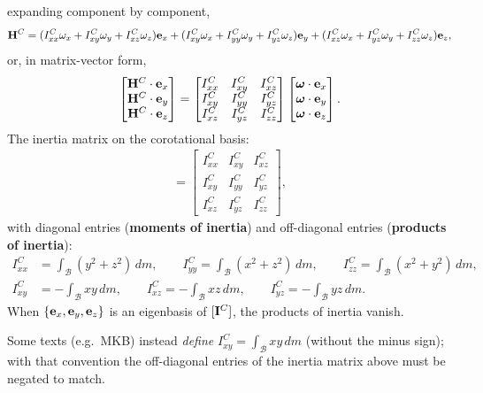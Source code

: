 \documentclass[
  letterpaper,
  DIV=11,
  numbers=noendperiod]{scrreprt}
\newcommand{\bomega}{\boldsymbol{\omega}}
\begin{document}
expanding component by component, \begin{align}
    {\bf H}^C = (I^C_{xx}\omega_x+I^C_{xy}\omega_y+I^C_{xz}\omega_z){\bf e}_x+(I^C_{xy}\omega_x+I^C_{yy}\omega_y+I^C_{yz}\omega_z){\bf e}_y+(I^C_{xz}\omega_x+I^C_{yz}\omega_y+I^C_{zz}\omega_z){\bf e}_z,
\end{align} or, in matrix-vector form, \begin{align}
    \begin{bmatrix}{\bf H}^C\cdot{\bf e}_x\\{\bf H}^C\cdot{\bf e}_y\\{\bf H}^C\cdot{\bf e}_z\end{bmatrix}
    =
    \begin{bmatrix}I^C_{xx}&I^C_{xy}&I^C_{xz}\\I^C_{xy}&I^C_{yy}&I^C_{yz}\\I^C_{xz}&I^C_{yz}&I^C_{zz}\end{bmatrix}
    \begin{bmatrix}\bomega\cdot{\bf e}_x\\\bomega\cdot{\bf e}_y\\\bomega\cdot{\bf e}_z\end{bmatrix}.
\end{align} The inertia matrix on the corotational basis: \begin{align}
    [{\bf I}^C] =
    \begin{bmatrix}
        I^C_{xx} & I^C_{xy} & I^C_{xz}\\
        I^C_{xy} & I^C_{yy} & I^C_{yz}\\
        I^C_{xz} & I^C_{yz} & I^C_{zz}
    \end{bmatrix},
\end{align} with diagonal entries (\textbf{moments of inertia}) and
off-diagonal entries (\textbf{products of inertia}): \begin{align}
    I^C_{xx} &= \int_{\mathcal{B}}(y^2+z^2)\,dm, \qquad
    I^C_{yy} = \int_{\mathcal{B}}(x^2+z^2)\,dm, \qquad
    I^C_{zz} = \int_{\mathcal{B}}(x^2+y^2)\,dm,\\
    I^C_{xy} &= -\int_{\mathcal{B}}xy\,dm, \qquad
    I^C_{xz} = -\int_{\mathcal{B}}xz\,dm, \qquad
    I^C_{yz} = -\int_{\mathcal{B}}yz\,dm.
\end{align} When \(\{{\bf e}_x,{\bf e}_y,{\bf e}_z\}\) is an eigenbasis
of \([{\bf I}^C]\), the products of inertia vanish.

\begin{tcolorbox}[enhanced jigsaw, arc=.35mm, bottomrule=.15mm, bottomtitle=1mm, breakable, colback=white, colbacktitle=quarto-callout-important-color!10!white, colframe=quarto-callout-important-color-frame, coltitle=black, left=2mm, leftrule=.75mm, opacityback=0, opacitybacktitle=0.6, rightrule=.15mm, title=\textcolor{quarto-callout-important-color}{\faExclamation}\hspace{0.5em}{Note!}, titlerule=0mm, toprule=.15mm, toptitle=1mm]

Some texts (e.g.~MKB) instead \emph{define}
\(I^C_{xy}=\int_{\mathcal{B}}xy\,dm\) (without the minus sign); with
that convention the off-diagonal entries of the inertia matrix above
must be negated to match.

\end{tcolorbox}
\end{document}
